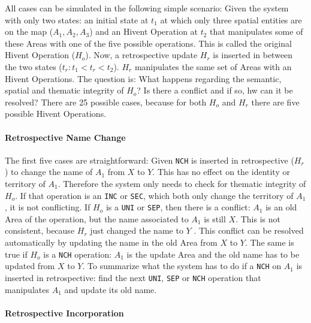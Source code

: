 All cases can be simulated in the following simple scenario: Given the system with only two states: an initial state at $t_1$ at which only three spatial entities are on the map ($A_1, A_2, A_3$) and an Hivent Operation at $t_2$ that manipulates some of these Areas with one of the five possible operations. This is called the original Hivent Operation ($H_o$). Now, a retrospective update $H_r$ is inserted in between the two states ($t_r: t_1 < t_r < t_2$). $H_r$ manipulates the same set of Areas with an Hivent Operations. The question is: What happens regarding the semantic, spatial and thematic integrity of $H_o$? Is there a conflict and if so, hw can it be resolved? There are 25 possible cases, because for both $H_o$ and $H_r$ there are five possible Hivent Operations.


\paragraph{Retrospective Name Change} %
\label{par:retrospective_name_change}

The first five cases are straightforward: Given \texttt{NCH} is inserted in retrospective ($H_r$) to change the name of $A_1$ from $X$ to $Y$. This has no effect on the identity or territory of $A_1$. Therefore the system only needs to check for thematic integrity of $H_o$. If that operation is an \texttt{INC} or \texttt{SEC}, which both only change the territory of $A_1$, it is not conflicting. If $H_o$ is a \texttt{UNI} or \texttt{SEP}, then there is a conflict: $A_1$ is an old Area of the operation, but the name associated to $A_1$ is still $X$. This is not consistent, because $H_r$ just changed the name to $Y$ . This conflict can be resolved automatically by updating the name in the old Area from $X$ to $Y$. The same is true if $H_o$ is a \texttt{NCH} operation: $A_1$ is the update Area and the old name has to be updated from $X$ to $Y$. To summarize what the system has to do if a \texttt{NCH} on $A_1$ is inserted in retrospective: find the next \texttt{UNI}, \texttt{SEP} or \texttt{NCH} operation that manipulates $A_1$ and update its old name.


\paragraph{Retrospective Incorporation} %
\label{par:retrospective_incorporation}

